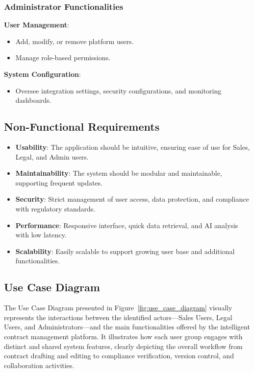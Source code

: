 \subsubsection{Administrator Functionalities}
\textbf{User Management}:
\begin{itemize}
    \item Add, modify, or remove platform users.
    \item Manage role-based permissions.
\end{itemize}

\textbf{System Configuration}:
\begin{itemize}
    \item Oversee integration settings, security configurations, and monitoring dashboards.
\end{itemize}

\subsection{Non-Functional Requirements}
\begin{itemize}
    \item \textbf{Usability}: The application should be intuitive, ensuring ease of use for Sales, Legal, and Admin users.
    \item \textbf{Maintainability}: The system should be modular and maintainable, supporting frequent updates.
    \item \textbf{Security}: Strict management of user access, data protection, and compliance with regulatory standards.
    \item \textbf{Performance}: Responsive interface, quick data retrieval, and AI analysis with low latency.
    \item \textbf{Scalability}: Easily scalable to support growing user base and additional functionalities.
\end{itemize}

\subsection{Use Case Diagram}
The Use Case Diagram presented in Figure~\ref{fig:use_case_diagram} visually represents the interactions between the identified actors—Sales Users, Legal Users, and Administrators—and the main functionalities offered by the intelligent contract management platform. It illustrates how each user group engages with distinct and shared system features, clearly depicting the overall workflow from contract drafting and editing to compliance verification, version control, and collaboration activities.


